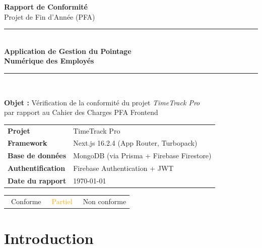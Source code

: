 \documentclass[12pt,a4paper]{article}
\newcommand{\cmark}{\textcolor{vert}{\ding{51}}}
\newcommand{\xmark}{\textcolor{rouge}{\ding{55}}}
\newcommand{\pmark}{\textcolor{orange}{\ding{115}}}
\begin{document}
\begin{titlepage}
\centering
\vspace*{2cm}
{\Huge\bfseries\color{headerblue} Rapport de Conformité}\\[0.5cm]
{\Large\color{bleu} Projet de Fin d'Année (PFA)}\\[1cm]
\rule{\textwidth}{1.5pt}\\[0.5cm]
{\LARGE\bfseries Application de Gestion du Pointage\\Numérique des Employés}\\[0.5cm]
\rule{\textwidth}{1.5pt}\\[2cm]

\begin{tcolorbox}[colback=grislight, colframe=headerblue, width=0.85\textwidth]
\centering
\textbf{Objet :} Vérification de la conformité du projet \textit{TimeTrack Pro}\\
par rapport au Cahier des Charges PFA Frontend
\end{tcolorbox}

\vspace{2cm}
\begin{tabular}{ll}
\textbf{Projet} & TimeTrack Pro \\
\textbf{Framework} & Next.js 16.2.4 (App Router, Turbopack) \\
\textbf{Base de données} & MongoDB (via Prisma + Firebase Firestore) \\
\textbf{Authentification} & Firebase Authentication + JWT \\
\textbf{Date du rapport} & \today \\
\end{tabular}

\vspace{2cm}
\begin{tabular}{ccc}
\cmark~\textcolor{vert}{Conforme} & \pmark~\textcolor{orange}{Partiel} & \xmark~\textcolor{rouge}{Non conforme}
\end{tabular}
\end{titlepage}

\tableofcontents
\newpage

\section{Introduction}
\end{document}
